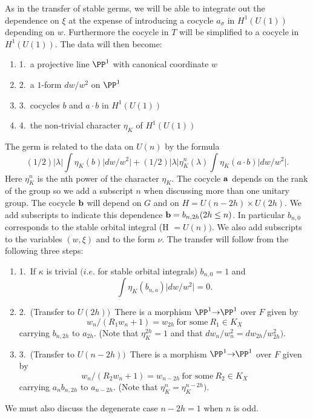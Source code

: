 \documentclass{memo-l}
\theoremstyle{definition}
\theoremstyle{remark}
\numberwithin{section}{chapter}
\numberwithin{equation}{chapter}
\begin{document}
\medpagebreak

   As in the transfer of stable germs, we will be able to integrate out the
dependence on ${\xi}$ at the expense of introducing a cocycle
$a_{{\sigma}}$ in $H^{1}(U(1))$ depending on $w$.  Furthermore the cocycle
in $T$ will be simplified to a cocycle in $H^{1}(U(1))$.  The data will
then become:
\begin{enumerate}
\item{1.}\  a projective line ${\PP}^{1}$ with canonical coordinate $w$
\item{2.}\  a $1$-form $dw/w^{2}$ on ${\PP}^{1}$
\item{3.}\  cocycles $b$ and $a\cdot b$ in $H^{1}(U(1))$
\item{4.}\  the non-trivial character ${\eta}_{K}$ of $H^{1}(U(1))$
\end{enumerate}
\medpagebreak

\noindent
The germ is related to the data on $U(n)$ by the formula
$$
(1/2)\vert {\lambda}\vert \int{\eta}_{K}(b)\vert dw/w^{2}\vert +
(1/2)\vert {\lambda}\vert {\eta}_{K}^{n}({\lambda})
\int{\eta}_{K}(a\cdot b)\vert dw/w^{2}\vert.
$$
Here ${\eta}_{K}^{n}$ is the nth power of the character ${\eta}_{K}$.  The
cocycle ${\bold a}$ depends on the rank of the group so we add a subscript
$n$ when discussing more than one unitary group.  The cocycle ${\bold b}$
will depend on $G$ and on $H  =  U(n-2h) \times U(2h)$.  We add subscripts to
indicate this dependence ${\bold b}  =  b_{n,2h} (2h \le n)$.  In
particular $b_{n,0}$ corresponds to the stable orbital integral (H $ = 
U(n))$.  We also add subscripts to the variables $(w,{\xi})$ and to the
form ${\nu}$.  The transfer will follow from the following three steps:
\begin{enumerate}
\item{1.}\  If ${\kappa}$ is trivial $(i.e$.  for stable orbital integrals)
$b_{n,0}  =  1$ and $$\int{\eta}_{K}(b_{n,o})\vert dw/w^{2}\vert  =  0.$$
\item{2.}\  (Transfer to $U(2h))$\ There is a morphism ${\PP}^{1} {\to} 
{\PP}^{1}$ over $F$ given by
$$
w_{n}/(R_{1}w_{n} + 1)  =  w_{2h}\ {\text{for\ some}}\  R_{1}  \in  K_X
$$
carrying $b_{n,2h}$ to $a_{2h}$.  
(Note that ${\eta}_{K}^{2h}  =  1$
and that $dw_{n}/w_{n}^{2}  =  dw_{2h}/w_{2h}^{2})$.
\smallskip
\item{3.}\   (Transfer to $U(n-2h))$\ There is a morphism ${\PP}^{1} {\to} 
{\PP}^{1}$ over $F$ given by
$$
w_{n}/(R_{2}w_{n} + 1)  =  w_{n-2h}\ {\text{for\ some}}\  R_{2}  \in  K_X
$$
carrying $a_{n}b_{n,2h}$ to $a_{n-2h}$.  (Note that ${\eta}_{K}^{n}
 =  {\eta}_{K}^{n-2h})$.
\end{enumerate}
\noindent
We must also discuss the degenerate case $n-2h = 1$ when $n$ is odd.
\end{document}
